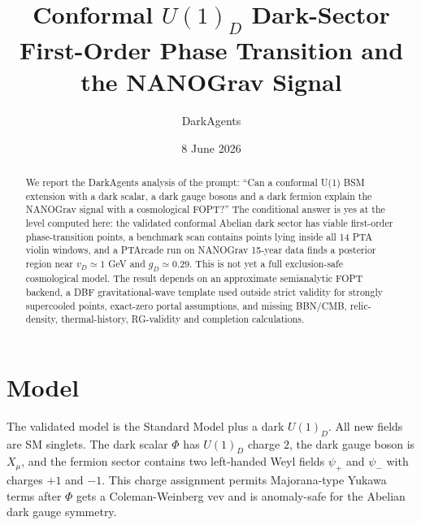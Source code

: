 \documentclass[11pt]{article}
\title{Conformal \(U(1)_D\) Dark-Sector First-Order Phase Transition and the NANOGrav Signal}
\author{DarkAgents}
\date{8 June 2026}
\begin{document}
\maketitle

\begin{abstract}
We report the DarkAgents analysis of the prompt: ``Can a conformal U(1) BSM extension with a dark scalar, a dark gauge bosons and a dark fermion explain the NANOGrav signal with a cosmological FOPT?''  The conditional answer is yes at the level computed here: the validated conformal Abelian dark sector has viable first-order phase-transition points, a benchmark scan contains points lying inside all 14 PTA violin windows, and a PTArcade run on NANOGrav 15-year data finds a posterior region near \(v_D\simeq 1\) GeV and \(g_D\simeq 0.29\).  This is not yet a full exclusion-safe cosmological model.  The result depends on an approximate semianalytic FOPT backend, a DBF gravitational-wave template used outside strict validity for strongly supercooled points, exact-zero portal assumptions, and missing BBN/CMB, relic-density, thermal-history, RG-validity and completion calculations.
\end{abstract}

\section{Model}
The validated model is the Standard Model plus a dark \(U(1)_D\).  All new fields are SM singlets.  The dark scalar \(\Phi\) has \(U(1)_D\) charge \(2\), the dark gauge boson is \(X_\mu\), and the fermion sector contains two left-handed Weyl fields \(\psi_+\) and \(\psi_-\) with charges \(+1\) and \(-1\).  This charge assignment permits Majorana-type Yukawa terms after \(\Phi\) gets a Coleman-Weinberg vev and is anomaly-safe for the Abelian dark gauge symmetry.
\end{document}
